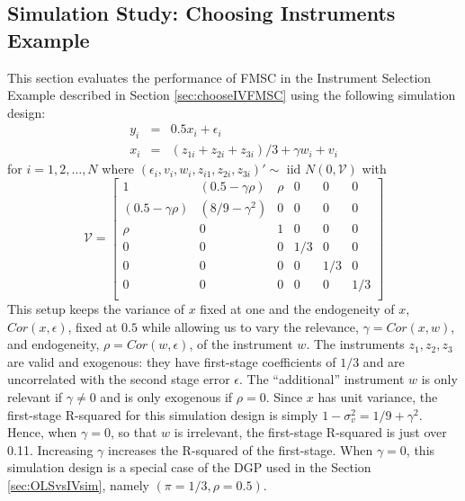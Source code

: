 \subsection{Simulation Study: Choosing Instruments Example}\label{sec:chooseIVsim}
This section evaluates the performance of FMSC in the Instrument Selection Example described in Section \ref{sec:chooseIVFMSC} using the following simulation design:
\begin{eqnarray}
		y_i &=& 0.5 x_i + \epsilon_i\\ 
		\label{eq:chooseIVDGP1}
		x_i &=& (z_{1i} + z_{2i} + z_{3i}) /3 + \gamma w_i + v_i 
		\label{eq:chooseIVDGP2}
	\end{eqnarray}
for $i=1, 2, \hdots, N$ where $(\epsilon_i, v_i, w_i, z_{i1}, z_{2i}, z_{3i})' \sim \mbox{ iid  } N(0,\mathcal{V})$ with	
\begin{equation}
			\label{eq:varmatrix}
			\mathcal{V} = \left[  
				\begin{array}{cccccc}
				1 & (0.5 - \gamma \rho) & \rho & 0 & 0 & 0\\
				(0.5 - \gamma \rho) & (8/9 - \gamma^2) & 0 & 0 & 0 & 0 \\
				\rho & 0 & 1 & 0 & 0 & 0\\
				0 & 0 & 0 & 1/3 & 0 & 0\\
				0 & 0 & 0 & 0 & 1/3 & 0\\
				0 & 0 & 0 & 0 & 0 & 1/3\\
				\end{array}
		\right]
		\label{eq:chooseIVDGP3}
\end{equation}
This setup keeps the variance of $x$ fixed at one and the endogeneity of $x$, $Cor(x, \epsilon)$, fixed at $0.5$ while allowing us to vary the relevance, $\gamma = Cor(x,w)$, and endogeneity, $\rho = Cor(w, \epsilon)$, of the instrument $w$.
The instruments $z_1, z_2, z_3$ are valid and exogenous: they have first-stage coefficients of $1/3$ and are uncorrelated with the second stage error $\epsilon$.
The ``additional'' instrument $w$ is only relevant if $\gamma \neq 0$ and is only exogenous if $\rho = 0$.
Since $x$ has unit variance, the first-stage R-squared for this simulation design is simply $1 - \sigma_v^2 = 1/9 + \gamma^2$.
Hence, when  $\gamma = 0$, so that $w$ is irrelevant, the first-stage R-squared is just over 0.11.
Increasing $\gamma$ increases the R-squared of the first-stage.
When $\gamma = 0$, this simulation design is a special case of the DGP used in the Section \ref{sec:OLSvsIVsim}, namely $(\pi=1/3, \rho = 0.5)$.
